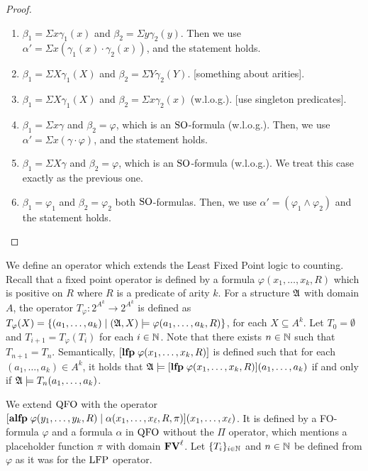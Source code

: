 \begin{proof}
\begin{enumerate}
		\begin{enumerate}
			\item $\beta_1 = \Sigma x \gamma_1(x)$ and $\beta_2 = \Sigma y \gamma_2(y)$. Then we use $\alpha' = \Sigma x(\gamma_1(x)\cdot\gamma_2(x))$, and the statement holds.
			\item $\beta_1 = \Sigma X \gamma_1(X)$ and $\beta_2 = \Sigma Y \gamma_2(Y)$. [something about arities].
			\item $\beta_1 = \Sigma X \gamma_1(X)$ and $\beta_2 = \Sigma x \gamma_2(x)$ (w.l.o.g.). [use singleton predicates].
			\item $\beta_1 = \Sigma x \gamma$ and $\beta_2 = \varphi$, which is an ${\rm SO}$-formula (w.l.o.g.). Then, we use $\alpha' = \Sigma x (\gamma \cdot \varphi)$, and the statement holds.
			\item $\beta_1 = \Sigma X \gamma$ and $\beta_2 = \varphi$, which is an ${\rm SO}$-formula (w.l.o.g.). We treat this case exactly as the previous one.
			\item $\beta_1 = \varphi_1$ and $\beta_2 = \varphi_2$ both ${\rm SO}$-formulas. Then, we use $\alpha' = (\varphi_1 \wedge \varphi_2)$ and the statement holds.
		\end{enumerate}
	\end{enumerate}
\end{proof}

We define an operator which extends the Least Fixed Point logic to counting. Recall that a fixed point operator is defined by a formula $\varphi(x_1,\ldots,x_k,R)$ which is positive on $R$ where $R$ is a predicate of arity $k$. For a structure $\mathfrak{A}$ with domain $A$, the operator $T_{\varphi}:2^{A^k} \to 2^{A^k}$ is defined as $T_{\varphi}(X) = \{(a_1,\ldots,a_k)\mid (\mathfrak{A},X)\models \varphi(a_1,\ldots,a_k,R) \}$, for each $X\subseteq A^k$. Let $T_0 = \emptyset$ and $T_{i+1} = T_{\varphi}(T_i)$ for each $i \in \mathbb{N}$. Note that there exists $n\in \mathbb{N}$ such that $T_{n+1} = T_n$. Semantically, $[{\bf lfp} \;\varphi(x_1,\ldots,x_k,R)]$ is defined such that for each $(a_1,\ldots,a_k)\in A^k$, it holds that $\mathfrak{A}\models[{\bf lfp} \;\varphi(x_1,\ldots,x_k,R)](a_1,\ldots,a_k)$ if and only if $\mathfrak{A}\models T_n(a_1,\ldots,a_k)$.

We extend ${\rm QFO}$ with the operator $[{\bf alfp} \;\varphi(y_1,\ldots,y_k,R)\mid\alpha(x_1,\ldots,x_{\ell},R,\pi)](x_1,\ldots,x_{\ell})$. It is defined by a FO-formula $\varphi$ and a formula $\alpha$ in ${\rm QFO}$ without the $\Pi$ operator, which mentions a placeholder function $\pi$ with domain $\mathbf{FV}^{\ell}$. Let $\{T_i\}_{i\in\mathbb{N}}$ and $n\in\mathbb{N}$ be defined from $\varphi$ as it was for the ${\rm LFP}$ operator.

